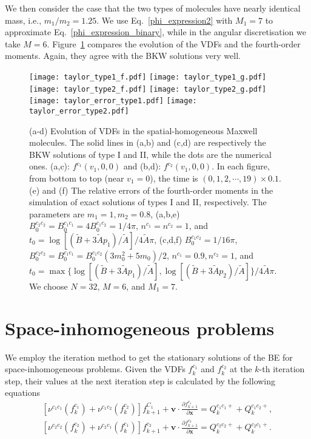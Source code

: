We then consider the case that the two types of molecules have nearly identical mass, i.e., $m_1/m_2=1.25$. We use Eq.~\eqref{phi_expression2} with $M_1=7$ to approximate Eq.~\eqref{phi_expression_binary}, while in the angular discretisation we take $M=6$. Figure~\ref{mixture12} compares the evolution of the VDFs and the fourth-order moments. Again, they agree with the BKW solutions very well.

\begin{figure}[htbp]
  \centering
  \texttt{[image: taylor\_type1\_f.pdf]}  \hskip 0.2cm
  \texttt{[image: taylor\_type1\_g.pdf]}\\
  \vskip 0.2cm
  \texttt{[image: taylor\_type2\_f.pdf]}  \hskip 0.2cm
  \texttt{[image: taylor\_type2\_g.pdf]}\\
  \vskip 0.2cm
  \texttt{[image: taylor\_error\_type1.pdf]}   \hskip 1.4cm
   \texttt{[image: taylor\_error\_type2.pdf]}
  \caption[Evolution of VDFs in the spatial-homogeneous Maxwell molecules when  $m_1=1,m_2=0.8$.]{(a-d) Evolution of VDFs in the spatial-homogeneous Maxwell molecules. The solid lines in (a,b) and (c,d) are respectively the BKW solutions of type I and II,  while the dots are the numerical ones. (a,c): $f^{c_1}(v_1,0,0)$ and (b,d): $f^{c_2}(v_1,0,0)$. In each figure, from bottom to top (near $v_1=0$), the time is $(0,1,2,\cdots,19)\times0.1$. (e) and (f) The relative errors of the   fourth-order moments in the simulation of exact solutions of types I and II, respectively. The parameters are $m_1=1,m_2=0.8$, (a,b,e) $B_0^{c_2c_2}=B_0^{c_1c_1}=4B_0^{c_1c_2}=1/4\pi$, $n^{c_1}=n^{c_2}=1$, and   $t_0=\log[(\widetilde{B}+3\widetilde{A}p_1)/\widetilde{A}]/4\widetilde{A}\pi$, (c,d,f) $B_0^{c_1c_2}=1/16\pi$, $B_0^{c_2c_2}=B_0^{c_1c_1}=B_0^{c_1c_2}(3m_0^2+5m_0)/2$, $n^{c_1}=0.9, n^{c_2}=1$, and  $t_0=\max\{\log[(\widetilde{B}+3\widetilde{A}p_1)/\widetilde{A}],\log[(\widetilde{B}+3\widetilde{A}p_2)/\widetilde{A}]\}/4\widetilde{A}\pi$. We choose $N=32$, $M=6$, and $M_1=7$. }   
  \label{mixture12}
\end{figure}



\section{Space-inhomogeneous problems}


We employ the iteration method to get the stationary solutions of the BE for space-inhomogeneous problems. Given the VDFs $f_k^{c_1}$ and $f_k^{c_2}$ at
the $k$-th iteration step, their values at the next iteration step
is calculated by the following equations
\begin{equation*} %
\begin{split}
    [\nu^{c_1c_1}(f^{c_1}_k)+\nu^{c_1c_2}(f^{c_2}_k)]{f}^{C_1}_{k+1}+\textbf{v}\cdot\frac{\partial {f}^{c_1}_{k+1}}{\partial{\textbf{x}}}=
    Q^{c_1c_1+}_k+Q^{c_1c_2+}_k,\\
	[\nu^{c_2c_2}(f^{c_2}_k)+\nu^{c_2c_1}(f^{c_1}_k)]{f}^{c_2}_{k+1}+\textbf{v}\cdot\frac{\partial{f}^{c_2}_{k+1}}{\partial{\textbf{x}}}=
	Q^{c_2c_2+}_k+Q^{c_2c_1+}_k.
\end{split}
\end{equation*}

